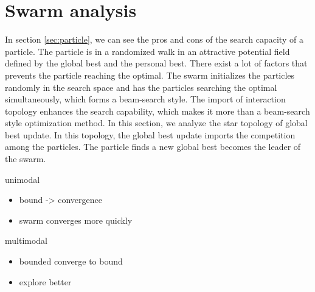 \section{Swarm analysis}
\label{sec:swarm}




In section \ref{sec:particle}, we can see the pros and cons of the search capacity of a particle.
The particle is in a randomized walk in an attractive potential field defined by the global best and the personal best.
There exist a lot of factors that prevents the particle reaching the optimal.
The swarm initializes the particles randomly in the search space and has the particles searching the optimal simultaneously, which forms a beam-search style.
The import of interaction topology enhances the search capability, which makes it more than a beam-search style optimization method.
In this section, we analyze the star topology of global best update.
In this topology, the global best update imports the competition among the particles.
The particle finds a new global best becomes the leader of the swarm.

unimodal
\begin{itemize}
\item bound -> convergence
\item swarm converges more quickly
\end{itemize}
multimodal
\begin{itemize}
\item bounded converge to bound
\item explore better
\end{itemize}

